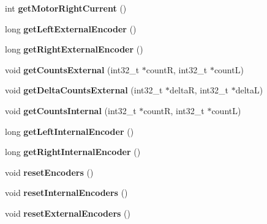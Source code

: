 \begin{DoxyCompactItemize}
\item 
\mbox{\label{classAsservDriver_ace1b02fcab067c77ee71a134614ace50}} 
int {\bfseries get\+Motor\+Right\+Current} ()
\item 
\mbox{\label{classAsservDriver_aa6924c9da7428d59fa712c15221dfbac}} 
long {\bfseries get\+Left\+External\+Encoder} ()
\item 
\mbox{\label{classAsservDriver_afda042c513d96188f8572899679cc616}} 
long {\bfseries get\+Right\+External\+Encoder} ()
\item 
\mbox{\label{classAsservDriver_a40d638a52c2ef3c2e98fe4ffa9a7bfe9}} 
void {\bfseries get\+Counts\+External} (int32\+\_\+t $\ast$countR, int32\+\_\+t $\ast$countL)
\item 
\mbox{\label{classAsservDriver_a588e61ea789b256d73fd04b1f7a840b5}} 
void {\bfseries get\+Delta\+Counts\+External} (int32\+\_\+t $\ast$deltaR, int32\+\_\+t $\ast$deltaL)
\item 
\mbox{\label{classAsservDriver_a643c154d40a2842293fcbf433dc73ee1}} 
void {\bfseries get\+Counts\+Internal} (int32\+\_\+t $\ast$countR, int32\+\_\+t $\ast$countL)
\item 
\mbox{\label{classAsservDriver_a01959c5fd48ed61fedfb22a6c3605ea2}} 
long {\bfseries get\+Left\+Internal\+Encoder} ()
\item 
\mbox{\label{classAsservDriver_a00e162296e20e589d7117b2427908aa6}} 
long {\bfseries get\+Right\+Internal\+Encoder} ()
\item 
\mbox{\label{classAsservDriver_a1d4095fd5abc9597f5aa35fc4d02f3fa}} 
void {\bfseries reset\+Encoders} ()
\item 
\mbox{\label{classAsservDriver_a9375c998721a68c0fcdd1c538642fdc6}} 
void {\bfseries reset\+Internal\+Encoders} ()
\item 
\mbox{\label{classAsservDriver_a62108360983265520b0401a71f810f6a}} 
void {\bfseries reset\+External\+Encoders} ()

\end{DoxyCompactItemize}
